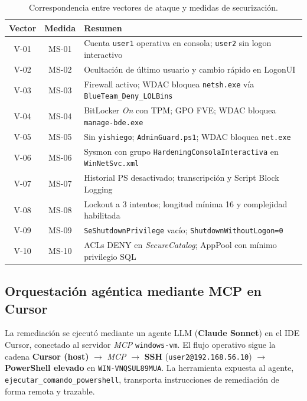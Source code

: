 \begin{table}[htbp]
\centering
\setlength{\tabcolsep}{4pt}
\small
\begin{tabular}{|c|c|>{\raggedright\arraybackslash}p{}|}
\hline
\textbf{Vector} & \textbf{Medida} & \textbf{Resumen} \\ \hline
V-01 & MS-01 & Cuenta \texttt{user1} operativa en consola; \texttt{user2} sin logon interactivo \\ \hline
V-02 & MS-02 & Ocultación de último usuario y cambio rápido en LogonUI \\ \hline
V-03 & MS-03 & Firewall activo; WDAC bloquea \texttt{netsh.exe} vía \texttt{BlueTeam\_}\allowbreak\texttt{Deny\_}\allowbreak\texttt{LOLBins} \\ \hline
V-04 & MS-04 & BitLocker \textit{On} con TPM; GPO FVE; WDAC bloquea \texttt{manage-bde.exe} \\ \hline
V-05 & MS-05 & Sin \texttt{yishiego}; \texttt{AdminGuard.ps1}; WDAC bloquea \texttt{net.exe} \\ \hline
V-06 & MS-06 & Sysmon con grupo \texttt{Hardening}\allowbreak\texttt{Consola}\allowbreak\texttt{Interactiva} en \texttt{WinNetSvc}\allowbreak\texttt{.xml} \\ \hline
V-07 & MS-07 & Historial PS desactivado; transcripción y Script Block Logging \\ \hline
V-08 & MS-08 & Lockout a 3 intentos; longitud mínima 16 y complejidad habilitada \\ \hline
V-09 & MS-09 & \texttt{SeShutdown}\allowbreak\texttt{Privilege} vacío; \texttt{Shutdown}\allowbreak\texttt{WithoutLogon=0} \\ \hline
V-10 & MS-10 & ACLs DENY en \textit{SecureCatalog}; AppPool con mínimo privilegio SQL \\ \hline
\end{tabular}
\caption{Correspondencia entre vectores de ataque y medidas de securización.}
\label{tab:vector_medida}
\end{table}

\subsection{Orquestación agéntica mediante MCP en Cursor}

La remediación se ejecutó mediante un agente LLM (\textbf{Claude Sonnet}) en el IDE Cursor, conectado al servidor \textit{MCP} \texttt{windows-vm}. El flujo operativo sigue la cadena \textbf{Cursor (host)} $\rightarrow$ \textit{MCP} $\rightarrow$ \textbf{SSH} (\texttt{user2@192.168.56.10}) $\rightarrow$ \textbf{PowerShell elevado} en \texttt{WIN-VNQSUL89MUA}. La herramienta expuesta al agente, \texttt{ejecutar\_}\allowbreak\texttt{comando\_}\allowbreak\texttt{powershell}, transporta instrucciones de remediación de forma remota y trazable.


